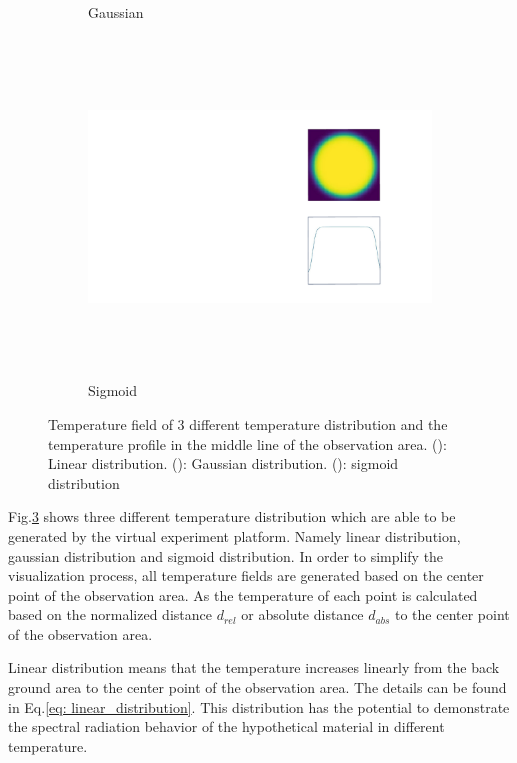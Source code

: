 \begin{figure}[htbp]
\begin{subfigure}{0.3\textwidth}
        \caption{Gaussian}
        \label{fig: gaussian_distribution}        
    \end{subfigure}
    \begin{subfigure}{0.3\textwidth}
        \centering
        \includegraphics[height=9cm]{figures/temp_distribution_c.pdf}
        \caption{Sigmoid}
        \label{fig: sigmoid_distribution}        
    \end{subfigure}
    \caption{Temperature field of 3 different temperature distribution and the 
    temperature profile in the middle line of the observation area. (): 
    Linear distribution. (): Gaussian distribution. 
    (): sigmoid distribution}
    \label{fig: temperature_profile}
\end{figure}


Fig.\ref{fig: temperature_profile} shows three different temperature distribution 
which are able to be generated by the virtual experiment platform. Namely linear 
distribution, gaussian distribution and sigmoid distribution. In order to simplify 
the visualization process, all temperature fields are generated based on the center 
point of the observation area. As the temperature of each point is calculated 
based on the normalized distance $d_{rel}$ or absolute distance ${d_{abs}}$ to the center point of the observation area.


Linear distribution means that the temperature increases linearly from the back ground 
area to the center point of the observation area. The details can be found in 
Eq.\ref{eq: linear_distribution}. This distribution has the potential to 
demonstrate the spectral radiation behavior of the hypothetical material in 
different temperature. 


